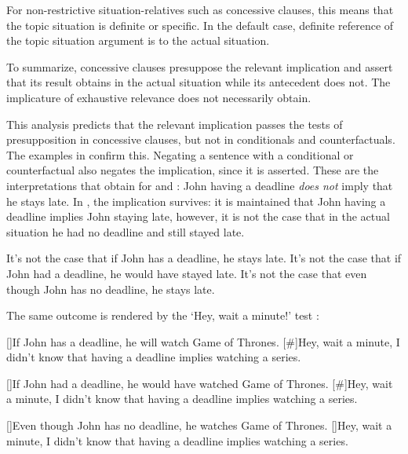 \documentclass[output=paper,
colorlinks,
citecolor=brown,
newtxmath
]{langscibook}
\begin{document}
\noindent For non-restrictive situation-relatives such as concessive clauses, this means that the topic situation is definite or specific. In the default case, definite reference of the topic situation argument is to the actual situation.

To summarize, concessive clauses presuppose the relevant implication and assert that its result obtains in the actual situation while its antecedent does not. The implicature of exhaustive relevance does not necessarily obtain.

This analysis predicts that the relevant implication passes the tests of presupposition in concessive clauses, but not in conditionals and counterfactuals. The examples in  confirm this. Negating a sentence with a conditional or counterfactual also negates the implication, since it is asserted. These are the interpretations that obtain for  and : John having a deadline \emph{does not} imply that he stays late. In , the implication survives: it is maintained that John having a deadline implies John staying late, however, it is not the case that in the actual situation he had no deadline and still stayed late.

\ea\label{ex:PresupTest1}
\ea It's not the case that if John has a deadline, he stays late.\label{ex:PresupTest1-a}
\ex It's not the case that if John had a deadline, he would have stayed late.\label{ex:PresupTest1-b}
\ex It's not the case that even though John has no deadline, he stays late.\label{ex:PresupTest1-c}
\z\z

\noindent The same outcome is rendered by the `Hey, wait a minute!' test \citep[see][]{Fintel2004}:

\ea\label{ex:PresupTest2}
\ea\label{ex:PresupTest2-a}
\begin{exe}
[]{If John has a deadline, he will watch Game of Thrones.\vspace{-3pt}}
[\#]{Hey, wait a minute, I didn't know that having a deadline implies watching a series.\smallskip}
\end{exe}
\ex\label{ex:PresupTest2-b}
\begin{exe}
[]{If John had a deadline, he would have watched Game of Thrones.\vspace{-3pt}}
[\#]{Hey, wait a minute, I didn't know that having a deadline implies watching a series.\smallskip}
\end{exe}
\ex\label{ex:PresupTest2-c}
\begin{exe}
[]{Even though John has no deadline, he watches Game of Thrones.\vspace{-3pt}}
[]{Hey, wait a minute, I didn't know that having a deadline implies watching a series.}
\end{exe}
\z\z
\end{document}
